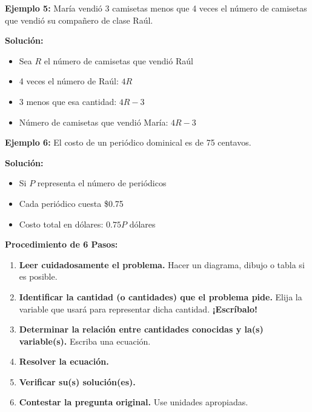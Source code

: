 \begin{example}
\textbf{Ejemplo 5:} María vendió 3 camisetas menos que 4 veces el número de camisetas que vendió su compañero de clase Raúl.

\textbf{Solución:}
\begin{itemize}
    \item Sea $R$ el número de camisetas que vendió Raúl
    \item 4 veces el número de Raúl: $4R$
    \item 3 menos que esa cantidad: $4R - 3$
    \item Número de camisetas que vendió María: $4R - 3$
\end{itemize}
\end{example}

\begin{example}
\textbf{Ejemplo 6:} El costo de un periódico dominical es de 75 centavos.

\textbf{Solución:}
\begin{itemize}
    \item Si $P$ representa el número de periódicos
    \item Cada periódico cuesta \$0.75
    \item Costo total en dólares: $0.75P$ dólares
\end{itemize}
\end{example}


\begin{theorem}
\textbf{Procedimiento de 6 Pasos:}

\begin{enumerate}
    \item \textbf{Leer cuidadosamente el problema.} Hacer un diagrama, dibujo o tabla si es posible.
    \item \textbf{Identificar la cantidad (o cantidades) que el problema pide.} Elija la variable que usará para representar dicha cantidad. \textbf{¡Escríbalo!}
    \item \textbf{Determinar la relación entre cantidades conocidas y la(s) variable(s).} Escriba una ecuación.
    \item \textbf{Resolver la ecuación.}
    \item \textbf{Verificar su(s) solución(es).}
    \item \textbf{Contestar la pregunta original.} Use unidades apropiadas.
\end{enumerate}
\end{theorem}

